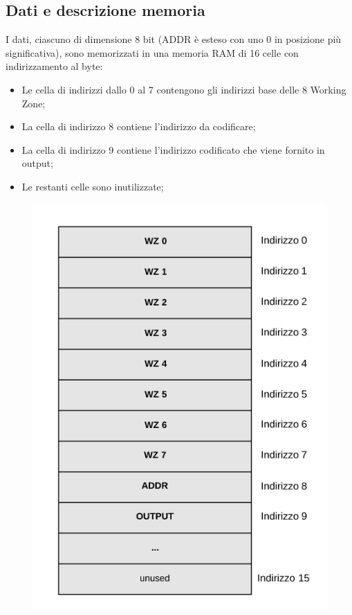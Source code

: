 \documentclass{article}
\begin{document}
\subsection{Dati e descrizione memoria}
I dati, ciascuno di dimensione 8 bit (ADDR è esteso con uno 0 in posizione più significativa), sono memorizzati in una memoria RAM di 16 celle con indirizzamento al byte:
\begin{itemize}
\item Le cella di indirizzi dallo 0 al 7 contengono gli indirizzi base delle 8 Working Zone;
\item La cella di indirizzo 8 contiene l'indirizzo da codificare;
\item La cella di indirizzo 9 contiene l'indirizzo codificato che viene fornito in output;
\item Le restanti celle sono inutilizzate;
\end{itemize}
\begin{figure}[h]
\includegraphics{memoria.png}
\end{figure}
\end{document}
